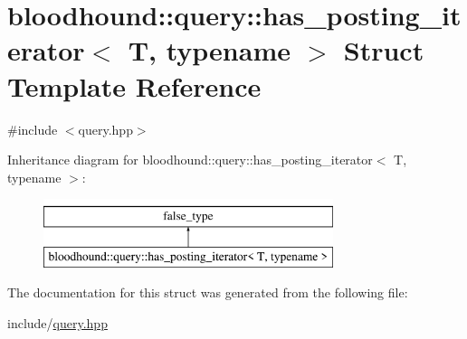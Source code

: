 \hypertarget{structbloodhound_1_1query_1_1has__posting__iterator}{}\section{bloodhound\+:\+:query\+:\+:has\+\_\+posting\+\_\+iterator$<$ T, typename $>$ Struct Template Reference}
\label{structbloodhound_1_1query_1_1has__posting__iterator}


{\ttfamily \#include $<$query.\+hpp$>$}

Inheritance diagram for bloodhound\+:\+:query\+:\+:has\+\_\+posting\+\_\+iterator$<$ T, typename $>$\+:\begin{figure}[H]
\begin{center}
\leavevmode
\includegraphics[height=2.000000cm]{structbloodhound_1_1query_1_1has__posting__iterator}
\end{center}
\end{figure}


The documentation for this struct was generated from the following file\+:\begin{DoxyCompactItemize}
\item 
include/\mbox{\hyperlink{query_8hpp}{query.\+hpp}}\end{DoxyCompactItemize}
